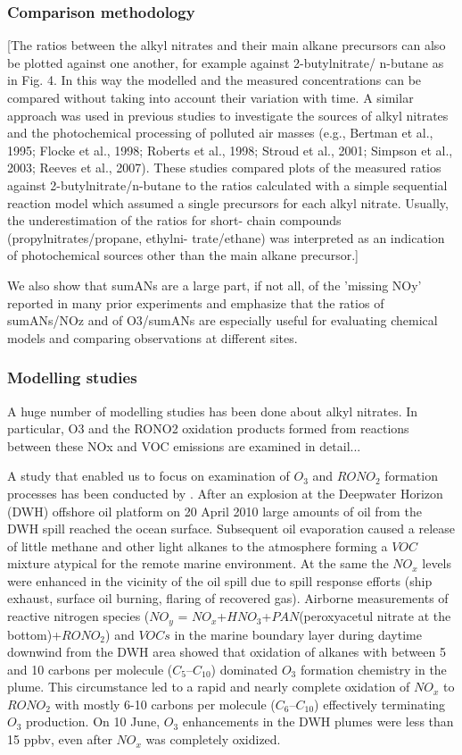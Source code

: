 \documentclass[11pt,a4paper]{article}
\begin{document}
\subsubsection{Comparison methodology}
\citep{Sommariva2008}
[The ratios between the alkyl nitrates and their
main alkane precursors can also be plotted against one another, for example against 2-butylnitrate/ n-butane as in Fig. 4. In this way the modelled and the measured concentrations can be compared without taking into account their variation with time. A similar approach was used in previous studies to investigate the sources of alkyl nitrates and the photochemical processing of polluted air masses (e.g., Bertman et al., 1995; Flocke et al., 1998; Roberts et al., 1998; Stroud et al., 2001; Simpson et al., 2003; Reeves et al., 2007). These studies compared plots of the measured ratios against 2-butylnitrate/n-butane to the ratios calculated with a simple sequential reaction model which assumed a single precursors for each alkyl nitrate. Usually, the underestimation of the ratios for short- chain compounds (propylnitrates/propane, ethylni- trate/ethane) was interpreted as an indication of photochemical sources other than the main alkane precursor.]

\citep{Day2003}
We also show that sumANs are a large part, if not all, of the 'missing NOy' reported in many prior experiments and emphasize that the ratios of sumANs/NOz and of O3/sumANs are especially useful for evaluating chemical models and comparing observations at different sites.

\subsubsection{Modelling studies}
A huge number of modelling studies has been done about alkyl nitrates. In particular, O3 and the RONO2 oxidation products formed from reactions between these NOx and VOC emissions are examined in detail... 

A study that enabled us to focus on examination of $O_3$ and $RONO_2$ formation processes has been conducted by \citep{Neuman2012}. After an explosion at the Deepwater Horizon (DWH) offshore oil platform on 20 April 2010 large amounts of oil from the DWH spill reached the ocean surface. Subsequent oil evaporation caused a release of little methane and other light alkanes to the atmosphere forming a $VOC$ mixture atypical for the remote marine environment. At the same the $NO_x$ levels were enhanced in the vicinity of the oil spill due to spill response efforts (ship exhaust, surface oil burning, flaring of recovered gas). Airborne measurements of reactive nitrogen species ($NO_y$ = $NO_x$+$HNO_3$+$PAN$(peroxyacetul nitrate at the bottom)+$RONO_2$) and $VOCs$ in the marine boundary layer during daytime downwind from the DWH area showed that oxidation of alkanes with between 5 and 10 carbons per molecule ($C_5$–$C_{10}$) dominated $O_3$ formation chemistry in the plume. This circumstance led to a rapid and nearly complete oxidation of $NO_x$ to $RONO_2$ with mostly 6-10 carbons per molecule ($C_6$–$C_{10}$) effectively terminating $O_3$ production. On 10 June, $O_3$ enhancements in the DWH plumes were less than 15 ppbv, even after $NO_x$ was completely oxidized. 
\end{document}
